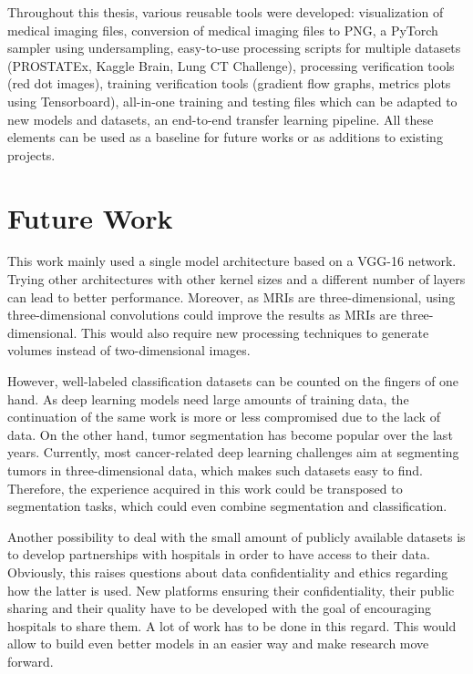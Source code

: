 Throughout this thesis, various reusable tools were developed: visualization of medical imaging files, conversion of medical imaging files to PNG, a PyTorch sampler using undersampling, easy-to-use processing scripts for multiple datasets (PROSTATEx, Kaggle Brain, Lung CT Challenge), processing verification tools (red dot images), training verification tools (gradient flow graphs, metrics plots using Tensorboard), all-in-one training and testing files which can be adapted to new models and datasets, an end-to-end transfer learning pipeline. All these elements can be used as a baseline for future works or as additions to existing projects.


\section{Future Work}
\setlength{\marginparwidth}{3cm}\leavevmode {}This work mainly used a single model architecture based on a VGG-16 network. Trying other architectures with other kernel sizes and a different number of layers can lead to better performance. Moreover, as MRIs are three-dimensional, using three-dimensional convolutions could improve the results as MRIs are three-dimensional. This would also require new processing techniques to generate volumes instead of two-dimensional images. 

However, well-labeled classification datasets can be counted on the fingers of one hand. As deep learning models need large amounts of training data, the continuation of the same work is more or less compromised due to the lack of data. On the other hand, tumor segmentation has become popular over the last years. Currently, most cancer-related deep learning challenges aim at segmenting tumors in three-dimensional data, which makes such datasets easy to find. Therefore, the experience acquired in this work could be transposed to segmentation tasks, which could even combine segmentation and classification. 

Another possibility to deal with the small amount of publicly available datasets is to develop partnerships with hospitals in order to have access to their data. Obviously, this raises questions about data confidentiality and ethics regarding how the latter is used. New platforms ensuring their confidentiality, their public sharing and their quality have to be developed with the goal of encouraging hospitals to share them. A lot of work has to be done in this regard. This would allow to build even better models in an easier way and make research move forward.

